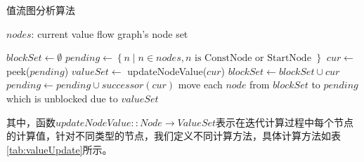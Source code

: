 \begin{algorithm}
[H]
	\caption{值流图分析算法}
	\label{alg:值流图分析算法}
	\begin{algorithmic}[1]
		
		\Require $nodes$: current value flow graph's node set
		
		\State $blockSet \gets \emptyset$
		\State $pending \gets \left\{ n \;|\; n \in nodes, n \text{ is ConstNode or StartNode }\right\}$
		\State $cur \gets $ peek($pending$)
		\State $valueSet \gets$ updateNodeValue($cur$)
		\State $blockSet \gets blockSet \cup cur$
		\State $pending \gets pending \cup successor(cur)$
		\State move each $node$ from $blockSet$ to $pending$ which is unblocked due to $valueSet$
		\EndIf
		\EndWhile
		
	\end{algorithmic}
\end{algorithm}

其中，函数$ updateNodeValue::Node \rightarrow ValueSet $表示在迭代计算过程中每个节点的计算值，针对不同类型的节点，我们定义不同计算方法，具体计算方法如表\ref{tab:valueUpdate}所示。

